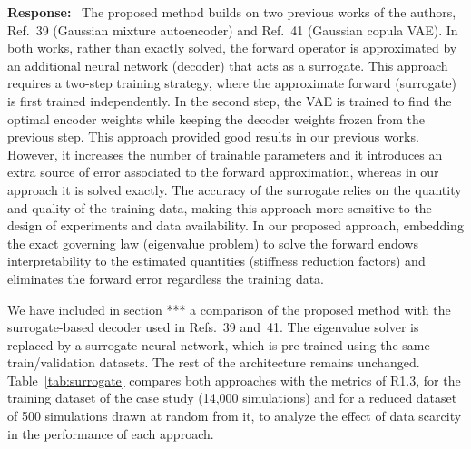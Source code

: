 \documentclass[11pt]{article}
\newenvironment{response}{\par\smallskip\noindent\color{resp}\textbf{Response:}\ }{\par}
\begin{document}
\begin{response}
The proposed method builds on two previous works of the authors, Ref.~39 (Gaussian mixture autoencoder) and Ref.~41 (Gaussian copula VAE).
In both works, rather than exactly solved, the forward operator is approximated by an additional neural network (decoder) that acts as a surrogate. 
This approach requires a two-step training strategy, where the approximate forward (surrogate) is first trained independently. 
In the second step, the VAE is trained to find the optimal encoder weights while keeping the decoder weights frozen from the previous step. 
This approach provided good results in our previous works. 
However, it increases the number of trainable parameters and it introduces an extra source of error associated to the forward approximation, whereas in our approach it is solved exactly. 
The accuracy of the surrogate relies on the quantity and quality of the training data, making this approach more sensitive to the design of experiments and data availability.  
In our proposed approach, embedding the exact governing law (eigenvalue problem) to solve the forward endows interpretability to the estimated quantities (stiffness reduction factors) and eliminates the forward error regardless the training data. 

We have included in section *** a comparison of the proposed method with the surrogate-based decoder used in Refs.~39 and~41.
The eigenvalue solver is replaced by a surrogate neural network, which is pre-trained using the same train/validation datasets. 
The rest of the architecture remains unchanged. 
Table~\ref{tab:surrogate} compares both approaches with the metrics of R1.3, for the training dataset of the case study (14,000 simulations) and for a reduced dataset of 500 simulations drawn at random from it, to analyze the effect of data scarcity in the performance of each approach.


\end{response}
\end{document}
